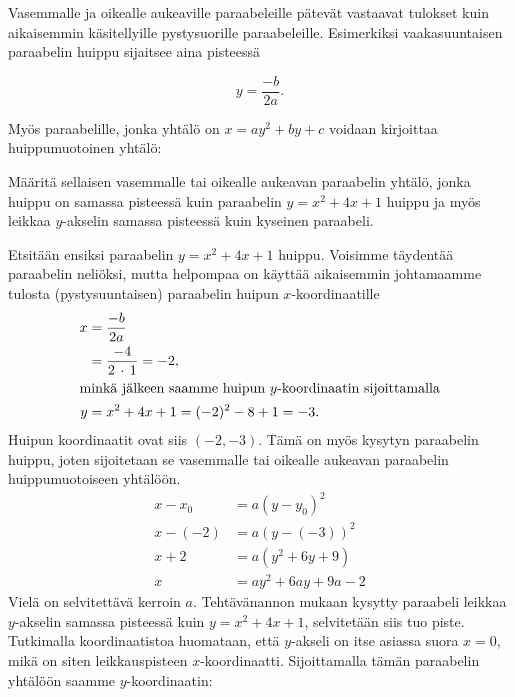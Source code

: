 Vasemmalle ja oikealle aukeaville paraabeleille pätevät vastaavat tulokset kuin aikaisemmin käsitellyille pystysuorille paraabeleille. Esimerkiksi vaakasuuntaisen paraabelin huippu sijaitsee aina pisteessä

\[y = \frac{-b}{2a}.\]


Myös paraabelille, jonka yhtälö on $x=ay^2+by+c$ voidaan kirjoittaa huippumuotoinen yhtälö:


\begin{esimerkki}
    Määritä sellaisen vasemmalle tai oikealle aukeavan paraabelin yhtälö, jonka huippu on samassa pisteessä kuin paraabelin $y = x^2 + 4x +1$ huippu ja myös leikkaa $y$-akselin samassa pisteessä kuin kyseinen paraabeli.
    \begin{esimratk} %
        Etsitään ensiksi paraabelin $y = x^2 + 4x +1$ huippu. Voisimme täydentää paraabelin neliöksi, mutta helpompaa on käyttää aikaisemmin johtamaamme tulosta (pystysuuntaisen) paraabelin huipun $x$-koordinaatille
        \begin{align*}
        x &= \frac{-b}{2a} \\
          &= \frac{-4}{2\,\cdot\,1} = -2, \\
        \intertext{minkä jälkeen saamme huipun $y$-koordinaatin sijoittamalla}
        y &= x^2 + 4x +1 = (-2)^2 - 8 +1 = -3.
        \end{align*}
        Huipun koordinaatit ovat siis $(-2, -3)$. Tämä on myös kysytyn paraabelin huippu, joten sijoitetaan se vasemmalle tai oikealle aukeavan paraabelin huippumuotoiseen yhtälöön.
        \begin{align*}
        x-x_0 &= a(y-y_0)^2\\
        x-(-2) &= a(y-(-3))^2 \\
        x +2 &= a(y^2 +6y +9)\\
        x &= ay^2 +6ay +9a -2
        \end{align*}
        Vielä on selvitettävä kerroin $a$. Tehtävänannon mukaan kysytty paraabeli leikkaa $y$-akselin samassa pisteessä kuin $y = x^2 + 4x +1$, selvitetään siis tuo piste. Tutkimalla koordinaatistoa huomataan, että $y$-akseli on itse asiassa suora $x = 0$, mikä on siten leikkauspisteen $x$-koordinaatti. Sijoittamalla tämän paraabelin yhtälöön saamme $y$-koordinaatin:

\end{esimratk}
\end{esimerkki}

